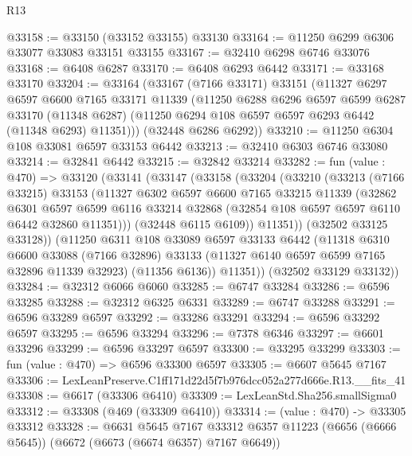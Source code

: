 \begin{lexlean}{R13}
\begin{coremodule}
@33158 := @33150 (@33152 @33155) @33130
@33164 := @11250 @6299 @6306 @33077 @33083 @33151 @33155
@33167 := @32410 @6298 @6746 @33076
@33168 := @6408 @6287
@33170 := @6408 @6293 @6442
@33171 := @33168 @33170
@33204 := @33164
    (@33167
      (@7166 @33171)
      @33151
      (@11327
        @6297
        @6597
        @6600
        @7165
        @33171
        @11339
        (@11250
          @6288
          @6296
          @6597
          @6599
          @6287
          @33170
          (@11348 @6287)
          (@11250 @6294 @108 @6597 @6597 @6293 @6442 (@11348 @6293) @11351)))
      (@32448 @6286 @6292))
@33210 := @11250 @6304 @108 @33081 @6597 @33153 @6442
@33213 := @32410 @6303 @6746 @33080
@33214 := @32841 @6442
@33215 := @32842 @33214
@33282 := fun (value : @470) =>
  @33120
    (@33141
      (@33147
        (@33158
          (@33204
            (@33210
              (@33213
                (@7166 @33215)
                @33153
                (@11327
                  @6302
                  @6597
                  @6600
                  @7165
                  @33215
                  @11339
                  (@32862
                    @6301
                    @6597
                    @6599
                    @6116
                    @33214
                    @32868
                    (@32854 @108 @6597 @6597 @6110 @6442 @32860 @11351)))
                (@32448 @6115 @6109))
              @11351))
          (@32502 @33125 @33128))
        (@11250
          @6311
          @108
          @33089
          @6597
          @33133
          @6442
          (@11318
            @6310
            @6600
            @33088
            (@7166 @32896)
            @33133
            (@11327 @6140 @6597 @6599 @7165 @32896 @11339 @32923)
            (@11356 @6136))
          @11351))
      (@32502 @33129 @33132))
@33284 := @32312 @6066 @6060
@33285 := @6747 @33284
@33286 := @6596 @33285
@33288 := @32312 @6325 @6331
@33289 := @6747 @33288
@33291 := @6596 @33289 @6597
@33292 := @33286 @33291
@33294 := @6596 @33292 @6597
@33295 := @6596 @33294
@33296 := @7378 @6346
@33297 := @6601 @33296
@33299 := @6596 @33297 @6597
@33300 := @33295 @33299
@33303 := fun (value : @470) => @6596 @33300 @6597
@33305 := @6607 @5645 @7167
@33306 := LexLeanPreserve.C1ff171d22d5f7b976dcc052a277d666e.R13.__fits_41
@33308 := @6617 (@33306 @6410)
@33309 := LexLeanStd.Sha256.smallSigma0
@33312 := @33308 (@469 (@33309 @6410))
@33314 := (value : @470) -> @33305 @33312
@33328 := @6631
    @5645
    @7167
    @33312
    @6357
    @11223
    (@6656 (@6666 @5645))
    (@6672 (@6673 (@6674 @6357) @7167 @6649))

\end{coremodule}
\end{lexlean}
